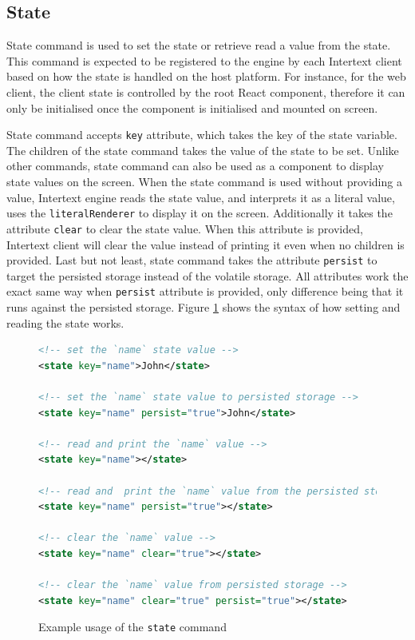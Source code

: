 \subsection{State}

State command is used to set the state or retrieve read a value from the state. This command is expected to be registered to the engine by each Intertext client based on how the state is handled on the host platform. For instance, for the web client, the client state is controlled by the root React component, therefore it can only be initialised once the component is initialised and mounted on screen. 

State command accepts \texttt{key} attribute, which takes the key of the state variable. The children of the state command takes the value of the state to be set. Unlike other commands, state command can also be used as a component to display state values on the screen. When the state command is used without providing a value, Intertext engine reads the state value, and interprets it as a literal value, uses the \texttt{literalRenderer} to display it on the screen. Additionally it takes the attribute \texttt{clear} to clear the state value. When this attribute is provided, Intertext client will clear the value instead of printing it even when no children is provided. Last but not least, state command takes the attribute \texttt{persist} to target the persisted storage instead of the volatile storage. All attributes work the exact same way when \texttt{persist} attribute is provided, only difference being that it runs against the persisted storage. Figure \ref{fig:how_state_is_set_and_read} shows the syntax of how setting and reading the state works.

\begin{figure}
\begin{minipage}{\linewidth}
\begin{lstlisting}[language=xml]
<!-- set the `name` state value -->
<state key="name">John</state>

<!-- set the `name` state value to persisted storage -->
<state key="name" persist="true">John</state>

<!-- read and print the `name` value -->
<state key="name"></state>

<!-- read and  print the `name` value from the persisted storage -->
<state key="name" persist="true"></state>

<!-- clear the `name` value -->
<state key="name" clear="true"></state>

<!-- clear the `name` value from persisted storage -->
<state key="name" clear="true" persist="true"></state>
\end{lstlisting}

\end{minipage}
\caption{Example usage of the \texttt{state} command}%
\label{fig:how_state_is_set_and_read}%
\end{figure}


